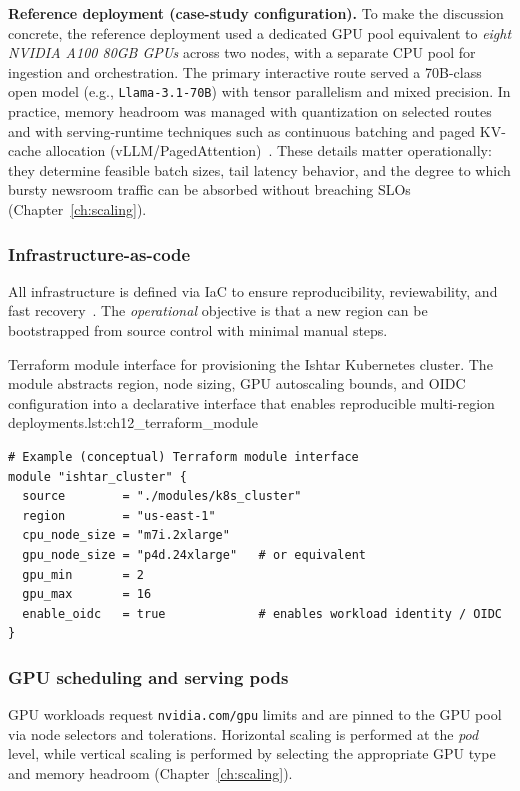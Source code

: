 \noindent\textbf{Reference deployment (case-study configuration).}
To make the discussion concrete, the \ishtar{} reference deployment used a dedicated GPU pool equivalent to \emph{eight NVIDIA A100 80GB GPUs} across two nodes, with a separate CPU pool for ingestion and orchestration.
The primary interactive route served a 70B-class open model (e.g., \texttt{Llama-3.1-70B}) with tensor parallelism and mixed precision.
In practice, memory headroom was managed with quantization on selected routes and with serving-runtime techniques such as continuous batching and paged KV-cache allocation (vLLM/PagedAttention)~\cite{Kwon2023vLLM,tgi_docs}.
These details matter operationally: they determine feasible batch sizes, tail latency behavior, and the degree to which bursty newsroom traffic can be absorbed without breaching SLOs (Chapter~\ref{ch:scaling}).

\subsubsection{Infrastructure-as-code}
All infrastructure is defined via IaC to ensure reproducibility, reviewability, and fast recovery~\cite{terraform-docs,terraform_recommended_practices}.
The \emph{operational} objective is that a new region can be bootstrapped from source control with minimal manual steps.

\begin{codebox}{Terraform module interface for provisioning the Ishtar Kubernetes cluster. The module abstracts region, node sizing, GPU autoscaling bounds, and OIDC configuration into a declarative interface that enables reproducible multi-region deployments.}{lst:ch12_terraform_module}
\begin{verbatim}
# Example (conceptual) Terraform module interface
module "ishtar_cluster" {
  source        = "./modules/k8s_cluster"
  region        = "us-east-1"
  cpu_node_size = "m7i.2xlarge"
  gpu_node_size = "p4d.24xlarge"   # or equivalent
  gpu_min       = 2
  gpu_max       = 16
  enable_oidc   = true             # enables workload identity / OIDC
}
\end{verbatim}
\end{codebox}

\subsubsection{GPU scheduling and serving pods}
GPU workloads request \texttt{nvidia.com/gpu} limits and are pinned to the GPU pool via node selectors and tolerations.
Horizontal scaling is performed at the \emph{pod} level, while vertical scaling is performed by selecting the appropriate GPU type and memory headroom (Chapter~\ref{ch:scaling}).

